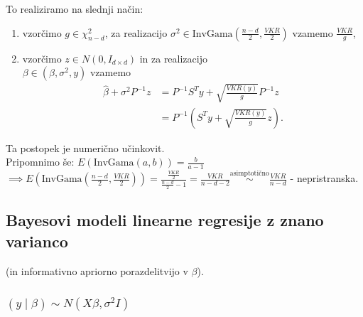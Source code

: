 \documentclass[a4paper, 12pt]{book}
\theoremstyle{definition}
\theoremstyle{remark}
\begin{document}
To realiziramo na slednji način:
\begin{enumerate}[label=(\roman*)]
  \item vzorčimo $g \in \chi_{n-d}^2$, za realizacijo
    $\sigma^2 \in \text{InvGama}\left(\frac{n-d}{2}, \frac{VKR}{2}\right)$ vzamemo $\frac{VKR}{g}$,
  \item vzorčimo $z \in N(0, I_{d \times d})$ in za realizacijo \\
    $\beta \in (\beta, \sigma^2, y)$ vzamemo
    \begin{align*}
      \hat{\beta} + \sigma^2 P^{-1} z &=
      P^{-1} S^T y + \sqrt{\frac{VKR(y)}{g}} P^{-1} z \\
      &= P^{-1} \left(S^T y + \sqrt{\frac{VKR(y)}{g}} z\right).
    \end{align*}
\end{enumerate}
Ta postopek je numerično učinkovit. \\
Pripomnimo še: $E(\text{InvGama}(a, b)) = \frac{b}{a-1}$ \\
$\implies E\left(\text{InvGama}\left(\frac{n-d}{2}, \frac{VKR}{2}\right)\right)
= \frac{\frac{VKR}{2}}{\frac{n-d}{2} - 1} = \frac{VKR}{n-d-2} \stackrel{\text{asimptotično}}{\sim} \frac{VKR}{n-d}$
- nepristranska.

\subsection{Bayesovi modeli linearne regresije z znano varianco}

(in informativno apriorno porazdelitvijo v $\beta$).

\subsubsection{$(y \mid \beta) \sim N(X \beta, \sigma^2 I)$}
\end{document}
